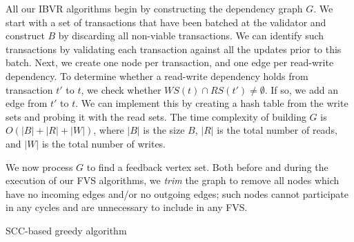 All our IBVR algorithms begin by constructing the dependency graph $G$. We start with a set of transactions that have been batched at the validator and construct $B$ by discarding all non-viable transactions. We can identify such transactions by validating each transaction against all the updates prior to this batch.
Next, we create one node per transaction, and one edge per read-write dependency. To determine whether a read-write dependency holds from transaction $t'$ to $t$, we check whether $WS(t) \cap RS(t') \neq \emptyset$. If so, we add an edge from $t'$ to $t$. We can implement this by creating a hash table from the write sets and probing it with the read sets. The time complexity of building $G$ is $O(|B|+|R|+|W|)$, where $|B|$ is the size $B$, $|R|$ is the total number of reads, and $|W|$ is the total number of writes. 

We now process $G$ to find a feedback vertex set. Both before and during the execution of our FVS algorithms, we \emph{trim} the graph to remove all nodes which have no incoming edges and/or no outgoing edges; such nodes cannot participate in any cycles and are unnecessary to include in any FVS.

\eat{
\begin{algorithm}[t]
\caption{SCC-based greedy algorithm}
\label{alg:scc}
\begin{algorithmic}[1]
\Procedure{GreeduSccGraph}{$G$,$P$}
\State $V\gets \emptyset$
\State $G'\gets trim(G)$
\State $SCC = StronglyConnectedComponents(G')$
\For {$S \in SCC$} 
	\State $V\gets V\cup GreedyComponent(S, P)$
\EndFor
\Return{$V$}
\end{algorithmic}
\end{algorithm}
}%

\begin{algorithm}[t]
\SetAlgoLined\DontPrintSemicolon
{}


\caption{SCC-based greedy algorithm}
\label{alg:scc}
\end{algorithm}


